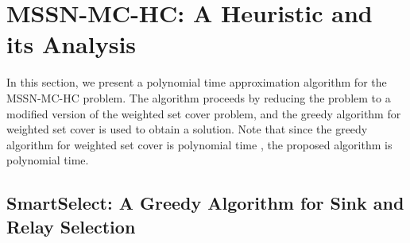 \documentclass[conference]{IEEEtran}
\begin{document}
\section{MSSN-MC-HC: A Heuristic and its Analysis}
\label{sec:smartselect}
In this section, we present a polynomial time approximation algorithm for the MSSN-MC-HC problem. The algorithm proceeds by reducing the problem to a modified version of the weighted set cover problem, and the greedy algorithm for weighted set cover is used to obtain a solution. Note that since the greedy algorithm for weighted set cover is polynomial time \cite{vazirani}, the proposed algorithm is polynomial time. 

\subsection{SmartSelect: A Greedy Algorithm for Sink and Relay Selection}
\end{document}
